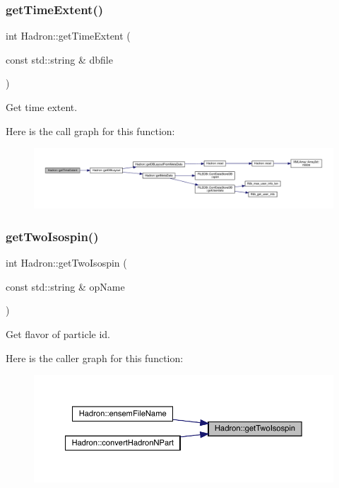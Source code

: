 \subsubsection{\texorpdfstring{getTimeExtent()}{getTimeExtent()}}
{\footnotesize\ttfamily int Hadron\+::get\+Time\+Extent (\begin{DoxyParamCaption}\item[{const std\+::string \&}]{dbfile }\end{DoxyParamCaption})}



Get time extent. 

Here is the call graph for this function\+:
\nopagebreak
\begin{figure}[H]
\begin{center}
\leavevmode
\includegraphics[width=350pt]{d1/daf/namespaceHadron_a660c9f3adc1525c9d326b23398d09494_cgraph}
\end{center}
\end{figure}
\mbox{\label{namespaceHadron_a28f936e0038f56334a16574038c9aa0b}} 
\subsubsection{\texorpdfstring{getTwoIsospin()}{getTwoIsospin()}}
{\footnotesize\ttfamily int Hadron\+::get\+Two\+Isospin (\begin{DoxyParamCaption}\item[{const std\+::string \&}]{op\+Name }\end{DoxyParamCaption})}



Get flavor of particle id. 

Here is the caller graph for this function\+:
\nopagebreak
\begin{figure}[H]
\begin{center}
\leavevmode
\includegraphics[width=350pt]{d1/daf/namespaceHadron_a28f936e0038f56334a16574038c9aa0b_icgraph}
\end{center}
\end{figure}
\mbox{\label{namespaceHadron_ab7c3962155ebb71e6377424d11c29daa}} 
